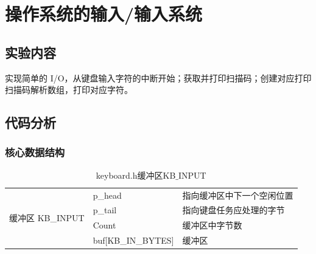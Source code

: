 \chapter{操作系统的输入/输入系统}\label{cha:latex-brief-intro}

\section{实验内容}
实现简单的 I/O，从键盘输入字符的中断开始；获取并打印扫描码；创建对应打印扫描码解析数组，打印对应字符。
\section{代码分析}

\subsection{核心数据结构}

\begin{table}[H]
\begin{center}
\caption{keyboard.h缓冲区KB$\_$INPUT}
\begin{tabular}{|c|l|l|}
\hline
\multirow{4}{*}{缓冲区 KB\_INPUT} & p\_head                & 指向缓冲区中下一个空闲位置 \\ \cline{2-3} 
                               & p\_tail                & 指向键盘任务应处理的字节  \\ \cline{2-3} 
                               & Count                  & 缓冲区中字节数       \\ \cline{2-3} 
                               & buf{[}KB\_IN\_BYTES{]} & 缓冲区           \\ \hline
\end{tabular}
\end{center}
\end{table}


